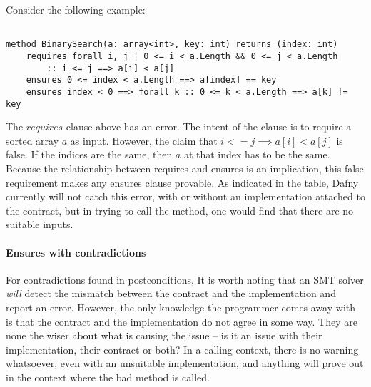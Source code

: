 \documentclass{article}
\newif\ifcomments
\newcommand{\egm}[1]{\ifcomments\textcolor{orange}{egm: #1}\fi}
\newcommand{\cass}[1]{\ifcomments\textcolor{blue}{cass: #1}\fi}
\begin{document}
\egm{Create a listings environment for Dafny and add in any additional Dafny keywords. See \href{https://github.com/ericmercer/SPIN-bpmn-cwp-verification-paper.git}{my spin paper} where I define an environment for Promela. Also, create the \emph{figref}, \emph{tabref}, and \emph{secref} comments for referring to figures, tables, and sections respectively. Example of that should be the paper as well.}
\cass{Someone posted a language definition for dafny for latex online and I edited it...but I don't know why the keywords aren't getting bolded! Idk, it just looks weird, and it seems like none of the 
settings I'm trying to set are working. I also added the referring stuff}

Consider the following example:

\begin{lstlisting}[language=dafny]

method BinarySearch(a: array<int>, key: int) returns (index: int)
    requires forall i, j | 0 <= i < a.Length && 0 <= j < a.Length
        :: i <= j ==> a[i] < a[j]
    ensures 0 <= index < a.Length ==> a[index] == key
    ensures index < 0 ==> forall k :: 0 <= k < a.Length ==> a[k] != key

\end{lstlisting}

The \(requires\) clause above has an error. The intent of the clause is to require a sorted array \(a\) as input.
However, the claim that \(i <= j \implies a[i] < a[j]\) is false. If the indices are the same, then \(a\) at that
index has to be the same. Because the relationship between requires and ensures is an implication, this false requirement
makes any ensures clause provable. As indicated in the table, Dafny currently will not catch this error, with or without an implementation attached to
the contract, but in trying to call the method, one would find that there are no suitable inputs.  

\paragraph{Ensures with contradictions}

For contradictions found in postconditions, It is worth noting that 
an SMT solver {\it will} detect the mismatch between the contract and the implementation and report an error. However, 
the only knowledge the programmer comes away with is that the contract and the implementation do not agree in some way. They are none the wiser 
about what is causing the issue – is it an issue with their implementation, their contract or both? In a calling context, there is no warning 
whatsoever, even with an unsuitable implementation, and anything will prove out in the context where the bad method is called. 
\end{document}
